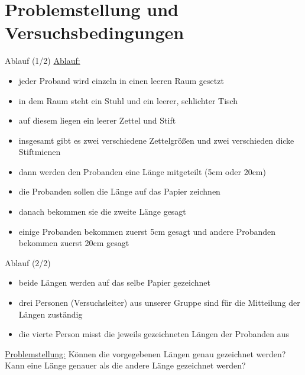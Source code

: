 \documentclass[ ngerman, fontsize= 10pt, headings=big, titlepage=true, xcolor=dvipsnames]{beamer}
\begin{document}
\section{Problemstellung und Versuchsbedingungen}
\begin{frame}{Ablauf (1/2)}
\underline{Ablauf:}
\begin{itemize}
\item jeder Proband wird einzeln in einen leeren Raum gesetzt
\item in dem Raum steht ein Stuhl und ein leerer, schlichter Tisch 
\item auf diesem liegen ein leerer Zettel und Stift
\item insgesamt gibt es zwei verschiedene Zettelgrößen und zwei verschieden dicke Stiftmienen
\item dann werden den Probanden eine Länge mitgeteilt (5cm oder 20cm)
\item die Probanden sollen die Länge auf das Papier zeichnen
\item danach bekommen sie die zweite Länge gesagt
\item einige Probanden bekommen zuerst 5cm gesagt und andere Probanden bekommen zuerst 20cm gesagt



\end{itemize}
	
\end{frame}
\begin{frame}{Ablauf (2/2)}
\begin{itemize}
\item beide Längen werden auf das selbe Papier gezeichnet 
\item drei Personen (Versuchsleiter) aus unserer Gruppe sind für die Mitteilung der Längen zuständig 
\item die vierte Person misst die jeweils gezeichneten Längen der Probanden aus
\end{itemize}
\underline{Problemstellung:}\newline
Können die vorgegebenen Längen genau gezeichnet werden? \newline
Kann eine Länge genauer als die andere Länge gezeichnet werden?

\end{frame}
\end{document}
